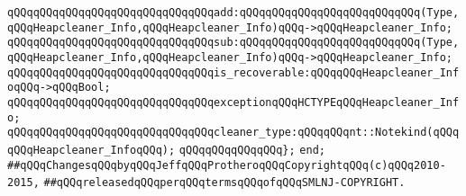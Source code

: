 \newline
\verb|qQQqqQQqqQQqqQQqqQQqqQQqqQQqqQQqadd:qQQqqQQqqQQqqQQqqQQqqQQqqQQq(Type,qQQqHeapcleaner_Info,qQQqHeapcleaner_Info)qQQq->qQQqHeapcleaner_Info;|\newline
\verb|qQQqqQQqqQQqqQQqqQQqqQQqqQQqqQQqsub:qQQqqQQqqQQqqQQqqQQqqQQqqQQq(Type,qQQqHeapcleaner_Info,qQQqHeapcleaner_Info)qQQq->qQQqHeapcleaner_Info;|\newline
\newline
\verb|qQQqqQQqqQQqqQQqqQQqqQQqqQQqqQQqis_recoverable:qQQqqQQqHeapcleaner_InfoqQQq->qQQqBool;|\newline
\newline
\verb|qQQqqQQqqQQqqQQqqQQqqQQqqQQqqQQqexceptionqQQqHCTYPEqQQqHeapcleaner_Info;|\newline
\newline
\verb|qQQqqQQqqQQqqQQqqQQqqQQqqQQqqQQqcleaner_type:qQQqqQQqnt::Notekind(qQQqqQQqHeapcleaner_InfoqQQq);|\newline
\newline
\verb|qQQqqQQqqQQqqQQq};|\newline
\verb|end;|\newline
\newline
\verb|##qQQqChangesqQQqbyqQQqJeffqQQqProtheroqQQqCopyrightqQQq(c)qQQq2010-2015,|\newline
\verb|##qQQqreleasedqQQqperqQQqtermsqQQqofqQQqSMLNJ-COPYRIGHT.|\newline

